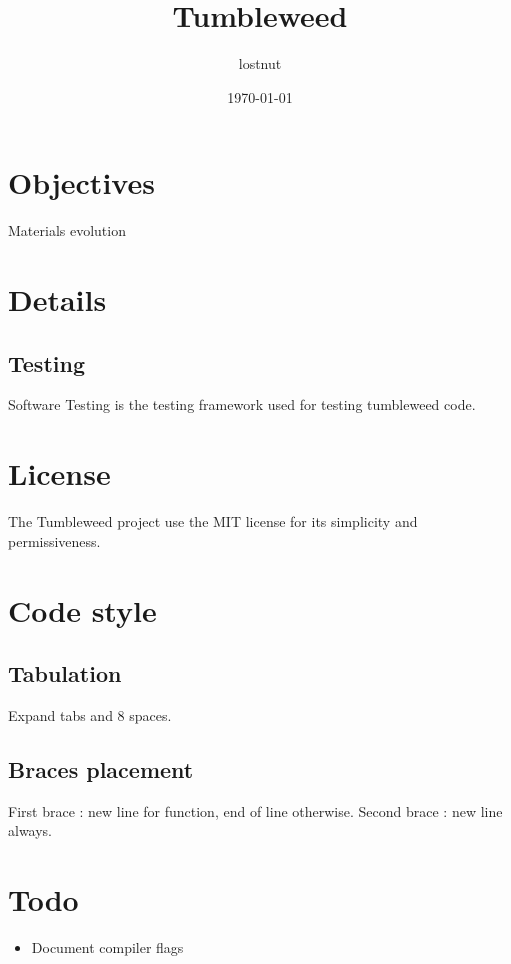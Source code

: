 

\title{Tumbleweed}
\author{lostnut}
\date{\today}


\maketitle
\tableofcontents

\section{Objectives}%
\label{sec:objectives}

Materials evolution

\section{Details}%
\label{sec:details}

\subsection{Testing}%
\label{sub:testing}

Software Testing is the testing framework used for testing tumbleweed code.

\section{License}%
\label{sec:license}

The Tumbleweed project use the MIT license for its simplicity and permissiveness.

\section{Code style}%
\label{sec:code_style}

\subsection{Tabulation}%
\label{sub:tabulation}

Expand tabs and 8 spaces.

\subsection{Braces placement}%
\label{sub:braces_placement}

First brace : new line for function, end of line otherwise.
Second brace : new line always.

\section{Todo}%
\label{sec:todo}

\begin{itemize}
        \item Document compiler flags
\end{itemize}

